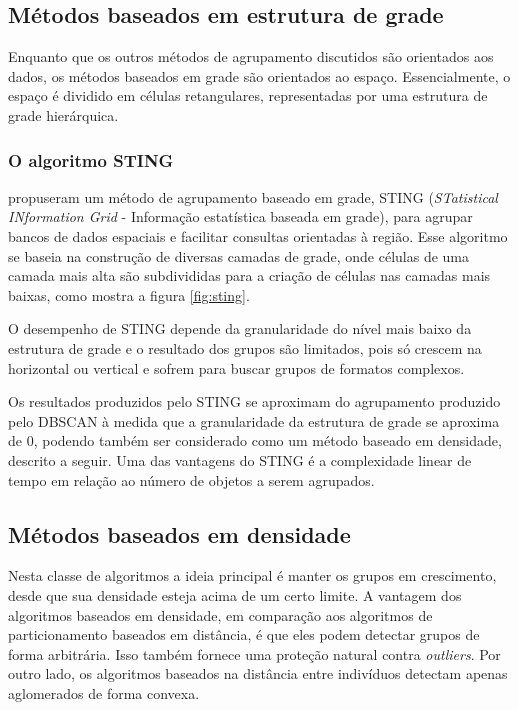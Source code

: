 \subsection{Métodos baseados em estrutura de grade}
Enquanto que os outros métodos de agrupamento discutidos são orientados aos dados, os métodos baseados em grade são orientados ao espaço. Essencialmente, o espaço é dividido em células retangulares, representadas por uma estrutura de grade hierárquica.

\subsubsection{O algoritmo STING}
\cite{Wang1997} propuseram um método de agrupamento baseado em grade, STING (\emph{STatistical INformation Grid} - Informação estatística baseada em grade), para agrupar bancos de dados espaciais e facilitar consultas orientadas à região. Esse algoritmo se baseia na construção de diversas camadas de grade, onde células de uma camada mais alta são subdivididas para a criação de células nas camadas mais baixas, como mostra a figura \ref{fig:sting}.

\begin{figure}[!ht]
	\centering	
\end{figure}

O desempenho de STING depende da granularidade do nível mais baixo da estrutura de grade e o resultado dos
grupos são limitados, pois só crescem na horizontal ou vertical e sofrem para buscar grupos de formatos complexos.

Os resultados produzidos pelo STING se aproximam do agrupamento produzido pelo
DBSCAN à medida que a granularidade da estrutura de grade se aproxima de 0, podendo
também ser considerado como um método baseado em densidade, descrito a seguir.
Uma das vantagens do STING é a complexidade linear de tempo em relação ao número de objetos a serem agrupados.

\subsection{Métodos baseados em densidade}
Nesta classe de algoritmos a ideia principal é manter os grupos em crescimento, desde que sua densidade esteja acima de um certo limite. A vantagem dos algoritmos baseados em densidade, em comparação aos algoritmos de particionamento baseados em distância, é que eles podem detectar grupos de forma arbitrária. Isso também fornece uma proteção natural contra \textit{outliers}. Por outro lado, os algoritmos baseados na distância entre indivíduos detectam apenas aglomerados de forma convexa.

